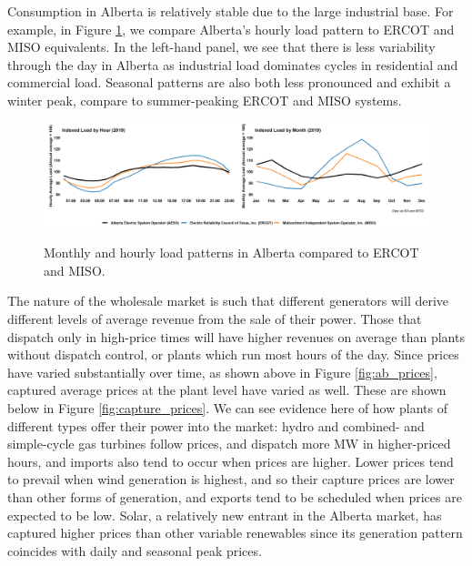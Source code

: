 \documentclass[12pt]{article}
\begin{document}
Consumption in Alberta is relatively stable due to the large industrial base. For example, in Figure \ref{fig:load_pattern}, we compare Alberta's hourly load pattern to ERCOT and MISO equivalents. In the left-hand panel, we see that there is less variability through the day in Alberta as industrial load dominates cycles in residential and commercial load. Seasonal patterns are also both less pronounced and exhibit a winter peak, compare to summer-peaking ERCOT and MISO systems.

\begin{figure}[!h]%
	\centering \vspace{-.25cm} \includegraphics[width=6.5in]{../images/load_compare.png}
\label{fig:load_pattern}
\vspace{-0.75cm}	\caption{Monthly and hourly load patterns in Alberta compared to ERCOT and MISO.}
\end{figure}

The nature of the wholesale market is such that different generators will derive different levels of average revenue from the sale of their power. Those that dispatch only in high-price times will have higher revenues on average than plants without dispatch control, or plants which run most hours of the day. Since prices have varied substantially over time, as shown above in Figure \ref{fig:ab_prices}, captured average prices at the plant level have varied as well. These are shown below in Figure \ref{fig:capture_prices}. We can see evidence here of how plants of different types offer their power into the market: hydro and combined- and simple-cycle gas turbines follow prices, and dispatch more MW in higher-priced hours, and imports also tend to occur when prices are higher. Lower prices tend to prevail when wind generation is highest, and so their capture prices are lower than other forms of generation, and exports tend to be scheduled when prices are expected to be low. Solar, a relatively new entrant in the Alberta market, has captured higher prices than other variable renewables since its generation pattern coincides with daily and seasonal peak prices.
\end{document}
